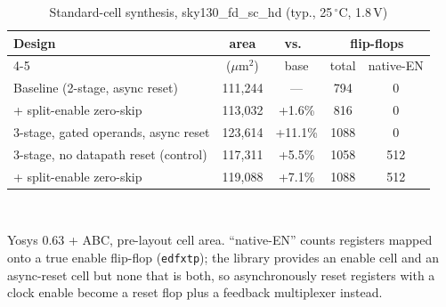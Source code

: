 \begin{table}[t]
\caption{Standard-cell synthesis, sky130\_fd\_sc\_hd (typ., 25\,$^{\circ}$C, 1.8\,V)}
\label{tab:asic}
\centering\footnotesize
\setlength{\tabcolsep}{3pt}
\begin{tabular}{lcccc}
\toprule
Design & area & vs.\ & \multicolumn{2}{c}{flip-flops}\\
\cmidrule(l){4-5}
& ($\mu$m$^2$) & base & total & native-EN\\
\midrule
Baseline (2-stage, async reset) & 111,244 & --- & 794 & 0\\
\quad + split-enable zero-skip & 113,032 & +1.6\% & 816 & 0\\
3-stage, gated operands, async reset & 123,614 & +11.1\% & 1088 & 0\\
3-stage, no datapath reset (control) & 117,311 & +5.5\% & 1058 & 512\\
\quad + split-enable zero-skip & 119,088 & +7.1\% & 1088 & 512\\
\bottomrule
\end{tabular}
\\[2pt]
\raggedright\scriptsize Yosys 0.63 + ABC, pre-layout cell area. ``native-EN''
counts registers mapped onto a true enable flip-flop (\texttt{edfxtp}); the
library provides an enable cell and an async-reset cell but none that is
both, so asynchronously reset registers with a clock enable become a reset
flop plus a feedback multiplexer instead.
\end{table}
